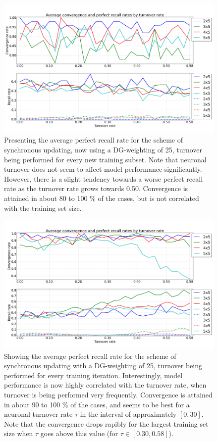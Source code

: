 \begin{figure}
    \centering
    \includegraphics[width=13cm]{fig/turnover_rates/sync_tm0_dgw25}
    \caption{Presenting the average perfect recall rate for the scheme of synchronous updating, now using a DG-weighting of 25, turnover being performed for every new training subset. Note that neuronal turnover does not seem to affect model performance significantly. However, there is a slight tendency towards a worse perfect recall rate as the turnover rate grows towards 0.50.
    Convergence is attained in about 80 to 100 \% of the cases, but is not correlated with the training set size.}
    \label{fig:sync_tm0_dgw25}
\end{figure}

\begin{figure}
    \centering
    \includegraphics[width=13cm]{fig/turnover_rates/sync_tm1_dgw25}
    \caption{Showing the average perfect recall rate for the scheme of synchronous updating with a DG-weighting of 25, turnover being performed for every training iteration. Interestingly, model performance is now highly correlated with the turnover rate, when turnover is being performed very frequently.
    Convergence is attained in about 90 to 100 \% of the cases, and seems to be best for a neuronal turnover rate $\tau$ in the interval of approximately $[0, 30]$. Note that the convergence drops rapibly for the largest training set size when $\tau$ goes above this value (for $\tau \in [0.30, 0.58]$).}
    \label{fig:sync_tm1_dgw25}
\end{figure}

